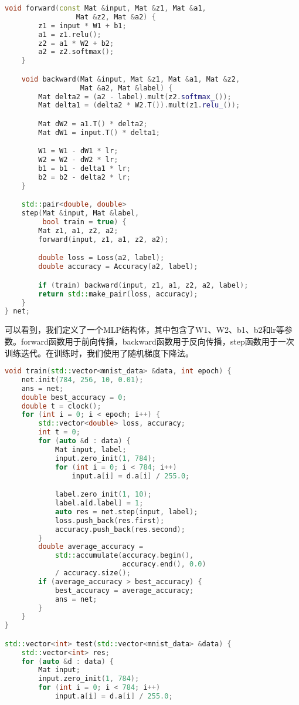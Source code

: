 \documentclass{ctexart}
\begin{document}
\begin{sloppypar}
\begin{lstlisting}[language=C++]
    void forward(const Mat &input, Mat &z1, Mat &a1,
                 Mat &z2, Mat &a2) {
        z1 = input * W1 + b1;
        a1 = z1.relu();
        z2 = a1 * W2 + b2;
        a2 = z2.softmax();
    }

    void backward(Mat &input, Mat &z1, Mat &a1, Mat &z2,
                  Mat &a2, Mat &label) {
        Mat delta2 = (a2 - label).mult(z2.softmax_());
        Mat delta1 = (delta2 * W2.T()).mult(z1.relu_());

        Mat dW2 = a1.T() * delta2;
        Mat dW1 = input.T() * delta1;

        W1 = W1 - dW1 * lr;
        W2 = W2 - dW2 * lr;
        b1 = b1 - delta1 * lr;
        b2 = b2 - delta2 * lr;
    }

    std::pair<double, double>
    step(Mat &input, Mat &label,
         bool train = true) { 
        Mat z1, a1, z2, a2;
        forward(input, z1, a1, z2, a2);

        double loss = Loss(a2, label);
        double accuracy = Accuracy(a2, label);

        if (train) backward(input, z1, a1, z2, a2, label);
        return std::make_pair(loss, accuracy);
    }
} net;
\end{lstlisting}
可以看到，我们定义了一个MLP结构体，其中包含了W1、W2、b1、b2和lr等参数。forward函数用于前向传播，backward函数用于反向传播，step函数用于一次训练迭代。在训练时，我们使用了随机梯度下降法。
\begin{lstlisting}[language=C++]
void train(std::vector<mnist_data> &data, int epoch) {
    net.init(784, 256, 10, 0.01);
    ans = net;
    double best_accuracy = 0;
    double t = clock();
    for (int i = 0; i < epoch; i++) {
        std::vector<double> loss, accuracy;
        int t = 0;
        for (auto &d : data) {
            Mat input, label;
            input.zero_init(1, 784);
            for (int i = 0; i < 784; i++)
                input.a[i] = d.a[i] / 255.0;

            label.zero_init(1, 10);
            label.a[d.label] = 1;
            auto res = net.step(input, label);
            loss.push_back(res.first);
            accuracy.push_back(res.second);
        }
        double average_accuracy =
            std::accumulate(accuracy.begin(),
                            accuracy.end(), 0.0)
            / accuracy.size();
        if (average_accuracy > best_accuracy) {
            best_accuracy = average_accuracy;
            ans = net;
        }
    }
}

std::vector<int> test(std::vector<mnist_data> &data) {
    std::vector<int> res;
    for (auto &d : data) {
        Mat input;
        input.zero_init(1, 784);
        for (int i = 0; i < 784; i++)
            input.a[i] = d.a[i] / 255.0;


\end{lstlisting}
\end{sloppypar}
\end{document}

